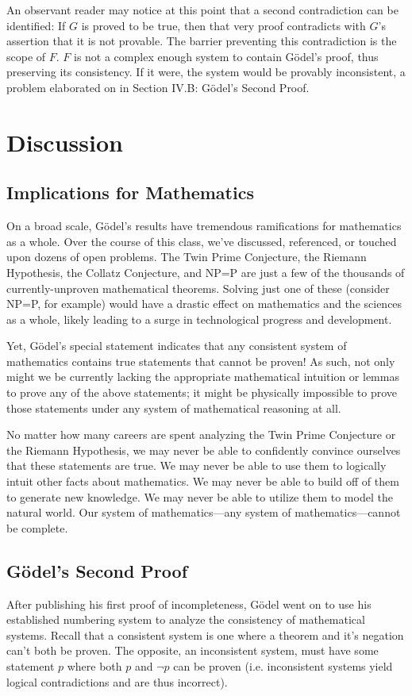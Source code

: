 \documentclass[conference]{IEEEtran}
\begin{document}
An observant reader may notice at this point that a second contradiction can be identified: If $G$ is proved to be true, then that very proof contradicts with $G$'s assertion that it is not provable. The barrier preventing this contradiction is the scope of $F$. $F$ is not a complex enough system to contain Gödel's proof, thus preserving its consistency. If it were, the system would be provably inconsistent, a problem elaborated on in Section IV.B: Gödel's Second Proof.

\section{Discussion}
\subsection{Implications for Mathematics}
On a broad scale, Gödel’s results have tremendous ramifications for mathematics as a whole. Over the course of this class, we’ve discussed, referenced, or touched upon dozens of open problems. The Twin Prime Conjecture, the Riemann Hypothesis, the Collatz Conjecture, and NP=P are just a few of the thousands of currently-unproven mathematical theorems. Solving just one of these (consider NP=P, for example) would have a drastic effect on mathematics and the sciences as a whole, likely leading to a surge in technological progress and development. 

Yet, Gödel’s special statement indicates that any consistent system of mathematics contains true statements that cannot be proven! As such, not only might we be currently lacking the appropriate mathematical intuition or lemmas to prove any of the above statements; it might be physically impossible to prove those statements under any system of mathematical reasoning at all.

No matter how many careers are spent analyzing the Twin Prime Conjecture or the Riemann Hypothesis, we may never be able to confidently convince ourselves that these statements are true. We may never be able to use them to logically intuit other facts about mathematics. We may never be able to build off of them to generate new knowledge. We may never be able to utilize them to model the natural world. Our system of mathematics—any system of mathematics—cannot be complete. 

\subsection{Gödel's Second Proof}
After publishing his first proof of incompleteness, Gödel went on to use his established numbering system to analyze the consistency of mathematical systems. Recall that a consistent system is one where a theorem and it's negation can't both be proven. The opposite, an inconsistent system, must have some statement $p$ where both $p$ and $\neg p$ can be proven (i.e. inconsistent systems yield logical contradictions and are thus incorrect). 
\end{document}
